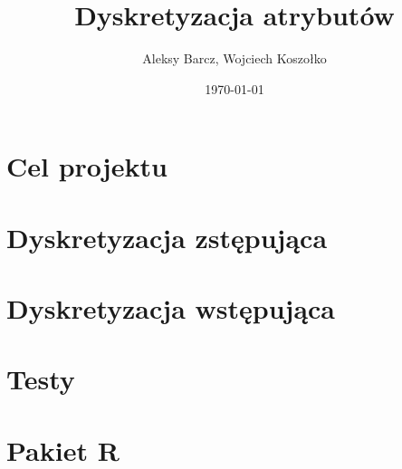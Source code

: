 \documentclass[11pt,a4paper]{report}
\date {\today}
\author {Aleksy Barcz, Wojciech Koszołko}
\title{Dyskretyzacja atrybutów}
\begin{document}
\maketitle
\tableofcontents



\chapter{Cel projektu}


\chapter{Dyskretyzacja zstępująca}


\chapter{Dyskretyzacja wstępująca}


\chapter{Testy}


\chapter{Pakiet R}


\nocite{*}

\end{document}
